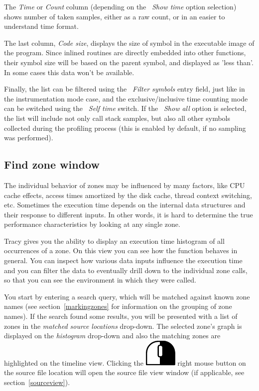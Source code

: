 \documentclass[hidelinks,titlepage,a4paper]{article}
\newcommand{\RMB}{\includegraphics[height=.8\baselineskip]{icons/rmb}}
\begin{document}
The \emph{Time} or \emph{Count} column (depending on the \emph{\faStopwatch{}~Show time} option selection) shows number of taken samples, either as a raw count, or in an easier to understand time format.

The last column, \emph{Code size}, displays the size of symbol in the executable image of the program. Since inlined routines are directly embedded into other functions, their symbol size will be based on the parent symbol, and displayed as 'less than'. In some cases this data won't be available.

Finally, the list can be filtered using the \emph{\faFilter{}~Filter symbols} entry field, just like in the instrumentation mode case, and the exclusive/inclusive time counting mode can be switched using the \emph{\faClock{}~Self time} switch. If the \emph{\faPuzzlePiece{}~Show all} option is selected, the list will include not only call stack samples, but also all other symbols collected during the profiling process (this is enabled by default, if no sampling was performed).

\subsection{Find zone window}
\label{findzone}

The individual behavior of zones may be influenced by many factors, like CPU cache effects, access times amortized by the disk cache, thread context switching, etc. Sometimes the execution time depends on the internal data structures and their response to different inputs. In other words, it is hard to determine the true performance characteristics by looking at any single zone.

Tracy gives you the ability to display an execution time histogram of all occurrences of a zone. On this view you can see how the function behaves in general. You can inspect how various data inputs influence the execution time and you can filter the data to eventually drill down to the individual zone calls, so that you can see the environment in which they were called.

You start by entering a search query, which will be matched against known zone names (see section~\ref{markingzones} for information on the grouping of zone names). If the search found some results, you will be presented with a list of zones in the \emph{matched source locations} drop-down. The selected zone's graph is displayed on the \emph{histogram} drop-down and also the matching zones are highlighted on the timeline view. Clicking the \RMB{} right mouse button on the source file location will open the source file view window (if applicable, see section~\ref{sourceview}).
\end{document}
